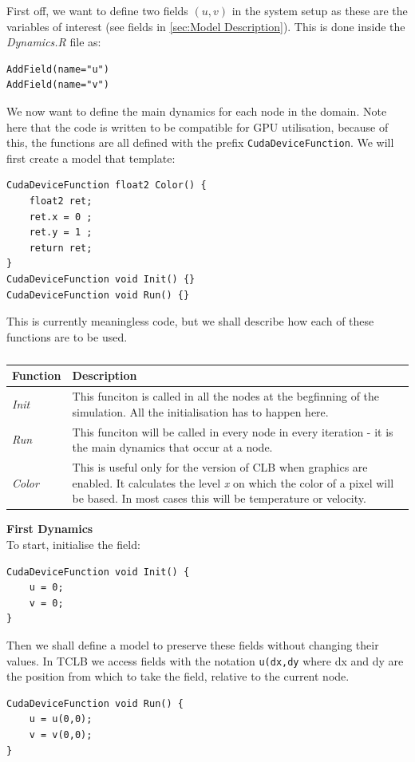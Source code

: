 \documentclass[12pt,a4paper]{report}
\begin{document}
First off, we want to define two fields $(u,v)$ in the system setup as these are the variables of interest (see fields in \ref{sec:Model Description}). This is done inside the \textit{Dynamics.R} file as:
\begin{lstlisting}
AddField(name="u")
AddField(name="v")
\end{lstlisting}

We now want to define the main dynamics for each node in the domain. Note here that the code is written to be compatible for GPU utilisation, because of this, the functions are all defined with the prefix \lstinline$CudaDeviceFunction$. We will first create a model that template:
\begin{lstlisting}
CudaDeviceFunction float2 Color() {
	float2 ret;
	ret.x = 0 ;
	ret.y = 1 ;
	return ret;
}
CudaDeviceFunction void Init() {}
CudaDeviceFunction void Run() {}
\end{lstlisting}
This is currently meaningless code, but we shall describe how each of these functions are to be used.
\begin{table}[!h]
  \centering
  \caption{}
    \begin{tabular}{p{2cm} p{12cm}}
    \toprule
    Function & Description\\
    \midrule
    \textit{Init} & This funciton is called in all the nodes at the begfinning of the simulation. All the initialisation has to happen here.\\
    \textit{Run} & This funciton will be called in every node in every iteration - it is the main dynamics that occur at a node.\\
    \textit{Color} & This is useful only for the version of CLB when graphics are enabled. It calculates the level \textit{x} on which the color of a pixel will be based. In most cases this will be temperature or velocity.\\
    \bottomrule
    \end{tabular}%
  \label{tab:initialfunctions}%
\end{table}

\textbf{First Dynamics} \\
To start, initialise the field:
\begin{lstlisting}
CudaDeviceFunction void Init() {
	u = 0;
	v = 0;
}
\end{lstlisting}
Then we shall define a model to preserve these fields without changing their values. In TCLB we access fields with the notation \lstinline$u(dx,dy$ where dx and dy are the position from which to take the field, relative to the current node.
\begin{lstlisting}
CudaDeviceFunction void Run() {
	u = u(0,0);
	v = v(0,0);
}
\end{lstlisting}
\end{document}
